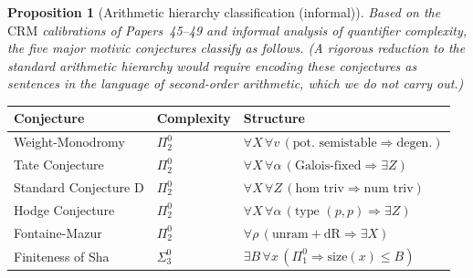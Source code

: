 \documentclass[11pt]{article}
\newtheorem{proposition}[theorem]{Proposition}
\theoremstyle{definition}
\theoremstyle{remark}
\newcommand{\CRM}{\mathrm{CRM}}
\begin{document}
\begin{proposition}[Arithmetic hierarchy classification (informal)]
\label{thm:D}
Based on the $\CRM$ calibrations of Papers~45--49 and informal analysis of quantifier complexity, the five major motivic conjectures classify as follows. (A rigorous reduction to the standard arithmetic hierarchy would require encoding these conjectures as sentences in the language of second-order arithmetic, which we do not carry out.)
\end{proposition}

\begin{center}
\begin{tabular}{lll}
\toprule
\textbf{Conjecture} & \textbf{Complexity} & \textbf{Structure} \\
\midrule
Weight-Monodromy & $\Pi_2^0$ & $\forall X\, \forall v\, (\text{pot.\ semistable} \Rightarrow \text{degen.})$ \\
Tate Conjecture & $\Pi_2^0$ & $\forall X\, \forall \alpha\, (\text{Galois-fixed} \Rightarrow \exists Z)$ \\
Standard Conjecture D & $\Pi_2^0$ & $\forall X\, \forall Z\, (\text{hom triv} \Rightarrow \text{num triv})$ \\
Hodge Conjecture & $\Pi_2^0$ & $\forall X\, \forall \alpha\, (\text{type } (p,p) \Rightarrow \exists Z)$ \\
Fontaine-Mazur & $\Pi_2^0$ & $\forall \rho\, (\text{unram} + \text{dR} \Rightarrow \exists X)$ \\
Finiteness of Sha & $\Sigma_3^0$ & $\exists B\, \forall x\, (\Pi_1^0 \Rightarrow \text{size}(x) \leq B)$ \\
\bottomrule
\end{tabular}
\end{center}
\end{document}
